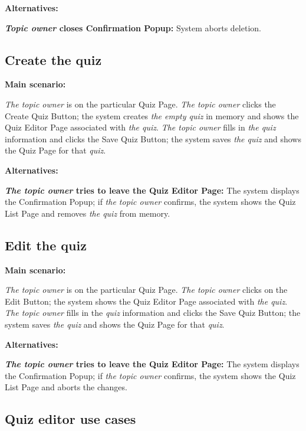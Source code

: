 \documentclass[
    english, %
]{VUMIFPSkursinis}
\begin{document}
\noindent\textbf{\fontsize{13}{15}\selectfont Alternatives:}

\textbf{\textit{Topic owner} closes Confirmation Popup:} System aborts deletion.

\subsection{Create the quiz}

\noindent\textbf{\fontsize{13}{15}\selectfont Main scenario:}

\textit{The topic owner} is on the particular Quiz Page. \textit{The topic owner} clicks the Create Quiz Button; the system creates \textit{the empty quiz} in memory and shows the Quiz Editor Page associated with \textit{the quiz}. \textit{The topic owner} fills in \textit{the quiz} information and clicks the Save Quiz Button; the system saves \textit{the quiz} and shows the Quiz Page for that \textit{quiz}.

\noindent\textbf{\fontsize{13}{15}\selectfont Alternatives:}

\textbf{\textit{The topic owner} tries to leave the Quiz Editor Page:} The system displays the Confirmation Popup; if \textit{the topic owner} confirms, the system shows the Quiz List Page and removes \textit{the quiz} from memory.

\subsection{Edit the quiz}

\noindent\textbf{\fontsize{13}{15}\selectfont Main scenario:}

\textit{The topic owner} is on the particular Quiz Page. \textit{The topic owner} clicks on the Edit Button; the system shows the Quiz Editor Page associated with \textit{the quiz}. \textit{The topic owner} fills in the \textit{quiz} information and clicks the Save Quiz Button; the system saves \textit{the quiz} and shows the Quiz Page for that \textit{quiz}.

\noindent\textbf{\fontsize{13}{15}\selectfont Alternatives:}

\textbf{\textit{The topic owner} tries to leave the Quiz Editor Page:} The system displays the Confirmation Popup; if \textit{the topic owner} confirms, the system shows the Quiz List Page and aborts the changes.

\subsection{Quiz editor use cases}
\end{document}
